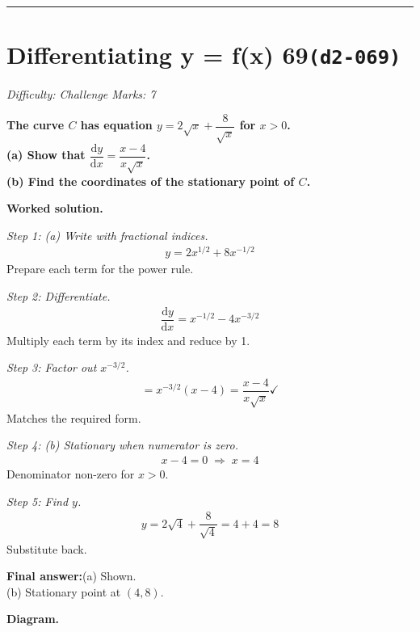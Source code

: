 \documentclass[11pt]{article}
\newcommand{\question}[1]{\par\medskip\noindent\textbf{#1}\par}
\begin{document}
\medskip\hrule

\section*{Differentiating y = f(x) 69\quad\small\texttt{(d2-069)}}
\textit{Difficulty: Challenge \quad\textbar\quad Marks: 7}

\question{The curve \( C \) has equation \( y = 2\sqrt{x} + \dfrac{8}{\sqrt{x}} \) for \( x > 0 \).\\[3pt]  (a) Show that \( \dfrac{\mathrm{d}y}{\mathrm{d}x} = \dfrac{x - 4}{x\sqrt{x}} \).\\[3pt]  (b) Find the coordinates of the stationary point of \( C \).}

\textbf{Worked solution.}

\textit{Step 1: (a) Write with fractional indices.}
\[\begin{gathered}
y = 2x^{1/2} + 8x^{-1/2}
\end{gathered}\]
Prepare each term for the power rule.

\textit{Step 2: Differentiate.}
\[\begin{gathered}
\dfrac{\mathrm{d}y}{\mathrm{d}x} = x^{-1/2} - 4x^{-3/2}
\end{gathered}\]
Multiply each term by its index and reduce by 1.

\textit{Step 3: Factor out \( x^{-3/2} \).}
\[\begin{gathered}
= x^{-3/2}(x - 4) = \dfrac{x - 4}{x\sqrt{x}} \checkmark
\end{gathered}\]
Matches the required form.

\textit{Step 4: (b) Stationary when numerator is zero.}
\[\begin{gathered}
x - 4 = 0 \;\Rightarrow\; x = 4
\end{gathered}\]
Denominator non-zero for \( x > 0 \).

\textit{Step 5: Find \( y \).}
\[\begin{gathered}
y = 2\sqrt{4} + \dfrac{8}{\sqrt{4}} = 4 + 4 = 8
\end{gathered}\]
Substitute back.

\begin{answerbox}
\textbf{Final answer:}\quad (a) Shown. \\[3pt]  (b) Stationary point at \(\displaystyle  (4, 8) \).
\end{answerbox}
\textbf{Diagram.}
\end{document}

